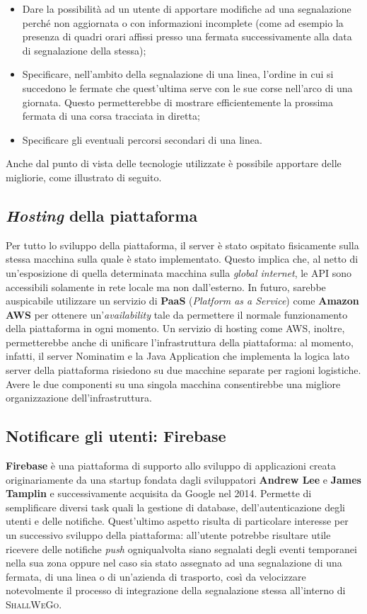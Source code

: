 		\begin{itemize}
			\item Dare la possibilità ad un utente di apportare modifiche ad una segnalazione perché non aggiornata o con informazioni incomplete (come ad esempio la presenza di quadri orari affissi presso una fermata successivamente alla data di segnalazione della stessa);
			\item Specificare, nell'ambito della segnalazione di una linea, l'ordine in cui si succedono le fermate che quest'ultima serve con le sue corse nell'arco di una giornata. Questo permetterebbe di mostrare efficientemente la prossima fermata di una corsa tracciata in diretta;
			\item Specificare gli eventuali percorsi secondari di una linea. 
		\end{itemize}

		Anche dal punto di vista delle tecnologie utilizzate è possibile apportare delle migliorie, come illustrato di seguito. 

		\subsection{\textit{Hosting} della piattaforma}
			Per tutto lo sviluppo della piattaforma, il server è stato ospitato fisicamente sulla stessa macchina sulla quale è stato implementato. Questo implica che, al netto di un'esposizione di quella determinata macchina sulla \textit{global internet}, le API sono accessibili solamente in rete locale ma non dall'esterno. In futuro, sarebbe auspicabile utilizzare un servizio di \textbf{PaaS} (\textit{Platform as a Service}) come \textbf{Amazon AWS} per ottenere un'\textit{availability} tale da permettere il normale funzionamento della piattaforma in ogni momento. Un servizio di hosting come AWS, inoltre, permetterebbe anche di unificare l'infrastruttura della piattaforma: al momento, infatti, il server Nominatim e la Java Application che implementa la logica lato server della piattaforma risiedono su due macchine separate per ragioni logistiche. Avere le due componenti su una singola macchina consentirebbe una migliore organizzazione dell'infrastruttura.

		\subsection{Notificare gli utenti: Firebase}
			\textbf{Firebase} è una piattaforma di supporto allo sviluppo di applicazioni creata originariamente da una startup fondata dagli sviluppatori \textbf{Andrew Lee} e \textbf{James Tamplin} e successivamente acquisita da Google nel 2014. Permette di semplificare diversi task quali la gestione di database, dell'autenticazione degli utenti e delle notifiche. Quest'ultimo aspetto risulta di particolare interesse per un successivo sviluppo della piattaforma: all'utente potrebbe risultare utile ricevere delle notifiche \textit{push} ogniqualvolta siano segnalati degli eventi temporanei nella sua zona oppure nel caso sia stato assegnato ad una segnalazione di una fermata, di una linea o di un'azienda di trasporto, così da velocizzare notevolmente il processo di integrazione della segnalazione stessa all'interno di \textsc{ShallWeGo}.